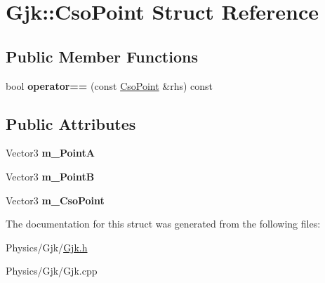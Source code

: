 \hypertarget{structGjk_1_1CsoPoint}{}\section{Gjk\+:\+:Cso\+Point Struct Reference}
\label{structGjk_1_1CsoPoint}
\subsection*{Public Member Functions}
\begin{DoxyCompactItemize}
\item 
\mbox{\label{structGjk_1_1CsoPoint_ad7e23024e0114e73d6978760a209782c}} 
bool {\bfseries operator==} (const \hyperlink{structGjk_1_1CsoPoint}{Cso\+Point} \&rhs) const
\end{DoxyCompactItemize}
\subsection*{Public Attributes}
\begin{DoxyCompactItemize}
\item 
\mbox{\label{structGjk_1_1CsoPoint_ab6e2f2cde5e989b193061c6ba1362261}} 
Vector3 {\bfseries m\+\_\+\+PointA}
\item 
\mbox{\label{structGjk_1_1CsoPoint_a1fb66d7493641a43ffa4fc2e4efecdc2}} 
Vector3 {\bfseries m\+\_\+\+PointB}
\item 
\mbox{\label{structGjk_1_1CsoPoint_ae9290f076800ece739001b3604018755}} 
Vector3 {\bfseries m\+\_\+\+Cso\+Point}
\end{DoxyCompactItemize}


The documentation for this struct was generated from the following files\+:\begin{DoxyCompactItemize}
\item 
Physics/\+Gjk/\hyperlink{Gjk_8h}{Gjk.\+h}\item 
Physics/\+Gjk/Gjk.\+cpp\end{DoxyCompactItemize}
